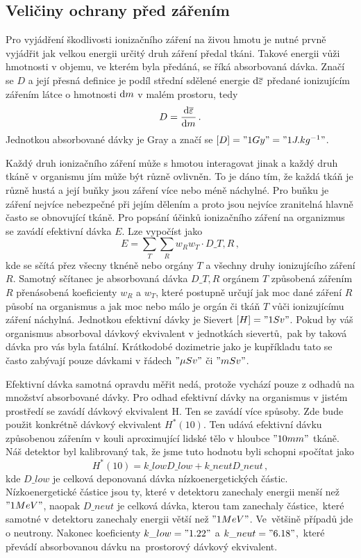 \documentclass[10pt,a4paper]{article}
\begin{document}
\subsection*{Veličiny ochrany před zářením}
Pro vyjádření škodlivosti ionizačního záření na živou hmotu je nutné
prvně vyjádřit jak velkou energii určitý druh záření předal tkáni.
Takové energii vůži hmotnosti v objemu, ve kterém byla předáná, se říká
absorbovaná dávka. Značí se $ D $ a její přesná definice je podíl střední
sdělené energie $\mathrm{d} \overline{\varepsilon}$ předané ionizujícím zářením
látce o hmotnosti $\mathrm{d} m$ v malém prostoru, tedy
$$D=\frac{\mathrm{d} \overline{\varepsilon}}{\mathrm{d} m}\,.$$
Jednotkou absorbované dávky je Gray a značí se ${[D]="1 Gy"="1 J.kg^{-1}"}$.\par
Každý druh ionizačního záření může s hmotou interagovat jinak a každý druh tkáně
v organismu jím může být různě ovlivněn. To je dáno tím, že každá tkáň je různě
hustá a její buňky jsou záření více nebo méně náchylné. Pro buňku je záření
nejvíce nebezpečné při jejím dělením a proto jsou nejvíce zranitelná hlavně
často se obnovující tkáně. Pro popsání účinků ionizačního záření na organizmus
se zavádí efektivní dávka $E$. Lze vypočíst jako
$$E=\sum_{T}\sum_{R} w_R w_T\cdot D\_{T,R}\,,$$
kde se sčítá přez všecny tknéně nebo orgány $T$ a všechny druhy ionizujícího
záření $R$. Samotný sčítanec je absorbovaná dávka $D\_{T,R}$ orgánem $T$
způsobená zářením $R$ přenásobená koeficienty $w_R$ a $w_T$, které postupně
určují jak moc dané záření $R$ působí na organismus a jak moc nebo málo je
orgán či tkáň $T$ vůči ionizujícímu záření náchylná. Jednotkou efektivní dávky
je Sievert ${[H]="1 Sv"}$. Pokud by váš organismus absorboval dávkový ekvivalent
v jednotkách sievertů,~pak by taková dávka pro vás byla fatální. Krátkodobé
dozimetrie jako je kupříkladu tato se často zabývají pouze dávkami v řádech
$ "\mu Sv" $ či $ "mSv" $.\par
Efektivní dávka samotná opravdu měřit nedá, protože vychází pouze z odhadů na
množství absorbované dávky. Pro odhad efektivní dávky na organismus v jistém
prostředí se zavádí dávkový ekvivalent H. Ten se zavádí více spůsoby. Zde
bude použit konkrétně dávkový ekvivalent $ H^\ast(10) $. Ten udává efektivní
dávku způsobenou zářením v kouli aproximující lidské tělo v hloubce
$"10 mm"$ tkáně. Náš detektor byl kalibrovaný tak, že jsme tuto hodnotu byli
schopni spočítat jako
$$H^\ast(10)=k\_{low}D\_{low}+k\_{neut}D\_{neut}\,,$$
kde $D\_{low}$ je celková deponovaná dávka nízkoenergetických částic.
Nízkoenergetické částice jsou ty, které v detektoru zanechaly energii menší než
$ "1 MeV" $, naopak $ D\_{neut} $ je celková dávka, kterou tam zanechaly
částice,~které samotné v detektoru zanechaly energii větší než $ "1 MeV" $.
Ve~většině případů jde o neutrony. Nakonec koeficienty
$ k\_{low}="1.22" $ a $ k\_{neut}="6.18" $,~které převádí absorbovanou dávku
na~prostorový dávkový ekvivalent.\par
\end{document}
